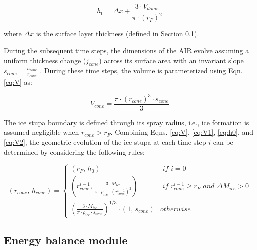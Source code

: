 \begin{equation}
	h_{0} =  \Delta x + \frac{3 \cdot V_{dome}}{\pi \cdot (r_F)^2 }
	\label{eq:h0}
\end{equation}

where $\Delta x$ is the surface layer thickness (defined in Section \ref{sec:energy}).

During the subsequent time steps, the dimensions of the AIR evolve assuming a uniform thickness change ($j_{cone}$)
across its surface area with an invariant slope $s_{cone} = \frac{h_{cone}}{r_{cone}}$ .  During these time
steps, the volume is parameterized using Eqn. \ref{eq:V} as:

\begin{equation} 
  V_{cone} = \frac{\pi \cdot {(r_{cone})}^3 \cdot s_{cone}}{3} 
\label{eq:V2} 
\end{equation}

The ice stupa boundary is defined through its spray radius, i.e., ice formation is assumed negligible when
$r_{cone} > r_{F}$. Combining Eqns. \ref{eq:V},  \ref{eq:V1}, \ref{eq:h0}, and \ref{eq:V2}, the geometric
evolution of the ice stupa at each time step $i$ can be determined by considering the following rules:

\begin{equation} (r_{cone},\, h_{cone}) = \left\{ \begin{array}{ll} (r_F ,\, h_0)                                                                          & \textit{ if } i=0 \\
             (r_{cone}^{i-1},\, \frac{3 \cdot M_{ice}}{\pi \cdot \rho_{ice} \cdot {(r_{cone}^{i-1})}^2}) & \textit{ if }
             r_{cone}^{i-1} \geq r_{F} \textit{ and } \Delta M_{ice} > 0                                                     \\ (\frac{3 \cdot M_{ice}}{\pi \cdot \rho_{ice} \cdot s_{cone}})^{1/3} \cdot (1,\,  s_{cone}) &
             otherwise\end{array} \right.  \label{eq:A2} \end{equation}

\subsection{Energy balance module} \label{sec:energy}

